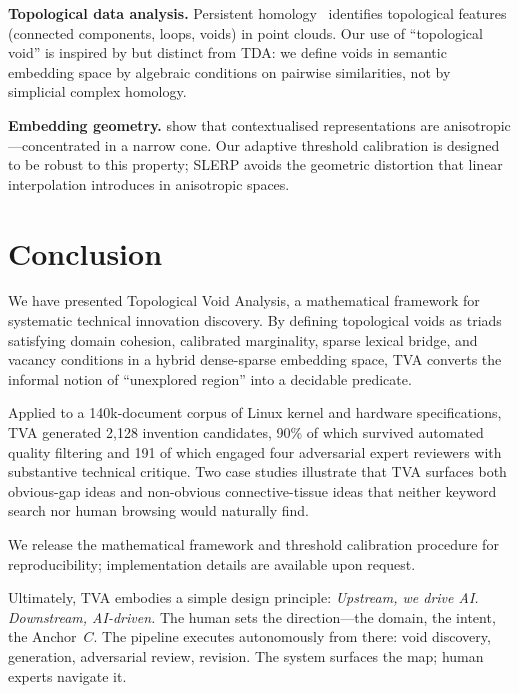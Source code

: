 \documentclass[11pt,twocolumn]{article}
\begin{document}
\textbf{Topological data analysis.}
Persistent homology~\cite{edelsbrunner2002tda} identifies topological
features (connected components, loops, voids) in point clouds.  Our
use of ``topological void'' is inspired by but distinct from TDA:
we define voids in semantic embedding space by algebraic conditions on
pairwise similarities, not by simplicial complex homology.

\textbf{Embedding geometry.}
\cite{ethayarajh2019anisotropy} show that contextualised
representations are anisotropic---concentrated in a narrow cone.  Our
adaptive threshold calibration is designed to be robust to this
property; SLERP avoids the geometric distortion that linear
interpolation introduces in anisotropic spaces.

\section{Conclusion}
\label{sec:conc}

We have presented Topological Void Analysis, a mathematical framework
for systematic technical innovation discovery.  By defining topological
voids as triads satisfying domain cohesion, calibrated marginality,
sparse lexical bridge, and vacancy conditions in a hybrid
dense-sparse embedding space, TVA converts the informal notion of
``unexplored region'' into a decidable predicate.

Applied to a 140k-document corpus of Linux kernel and hardware
specifications, TVA generated 2,128 invention candidates, 90\% of
which survived automated quality filtering and 191 of which engaged
four adversarial expert reviewers with substantive technical critique.
Two case studies illustrate that TVA surfaces both obvious-gap ideas
and non-obvious connective-tissue ideas that neither keyword search nor
human browsing would naturally find.

We release the mathematical framework and threshold calibration
procedure for reproducibility; implementation details are available
upon request.

Ultimately, TVA embodies a simple design principle:
\emph{Upstream, we drive AI. Downstream, AI-driven.}
The human sets the direction---the domain, the intent, the Anchor~$C$.
The pipeline executes autonomously from there: void discovery,
generation, adversarial review, revision.
The system surfaces the map; human experts navigate it.



\end{document}
